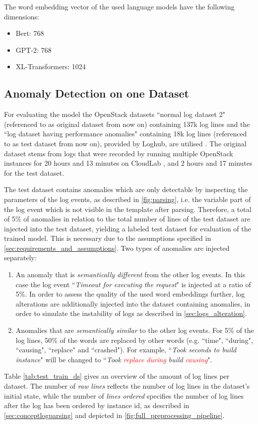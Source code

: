 \noindent The word embedding vector of the used language models have the following dimensions:
\begin{itemize}
	\item Bert: 768 
	\item GPT-2: 768
	\item XL-Transformers: 1024
\end{itemize}

\subsection{Anomaly Detection on one Dataset \label{sec:ad_one_ds_result}}
For evaluating the model the OpenStack datasets ``normal log dataset 2" (referenced to as original dataset from now on) containing 137k log lines and the ``log dataset having performance anomalies" containing 18k log lines (referenced to as test dataset from now on), provided by Loghub, are utilised \cite{utah_dataset}. The original dataset stems from logs  that were recorded by running multiple OpenStack instances for 20 hours and 13 minutes on CloudLab \cite{cloudlab}, and 2 hours and 17 minutes for the test dataset. 

The test dataset contains anomalies which are only detectable by inspecting the parameters of the log events, as described in \ref{fig:parsing}, i.e. the variable part of the log event which is not visible in the template after parsing. Therefore, a total of 5\% of anomalies in relation to the total number of lines of the test dataset are injected into the test dataset, yielding a labeled test dataset for evaluation of the trained model. This is necessary due to the assumptions specified in \ref{sec:requirements_and_assumptions}. Two types of anomalies are injected separately:
\begin{enumerate}
	\item An anomaly that is \textit{semantically different} from the other log events. In this case the log event ``\textit{Timeout for executing the request}" is injected at a ratio of 5\%. In order to assess the quality of the used word embeddings further, log alterations are additionally injected into the dataset containing anomalies, in order to simulate the instability of logs as described in \ref{sec:logs_alteration}.
	\item Anomalies that are \textit{semantically similar} to the other log events. For 5\% of the log lines, 50\% of the words are replaced by other words (e.g. ``time", ``during", ``causing", ``replace" and ``crashed"). For example, ``\textit{Took seconds to build instance}" will be changed to ``\textit{Took \textcolor{red}{replace} \textcolor{red}{during} build \textcolor{red}{causing}}".
\end{enumerate}
Table \ref{tab:test_train_ds} gives an overview of the amount of log lines per dataset. The number of \textit{raw lines} reflects the number of log lines in the dataset's initial state, while the number of \textit{lines ordered} specifies the number of log lines after the log has been ordered by instance id, as described in \ref{sec:conceptlogparsing} and depicted in \ref{fig:full_preprocessing_pipeline}.


